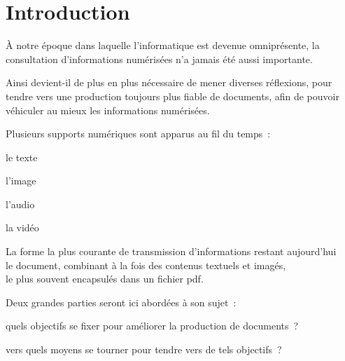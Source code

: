 \section{Introduction}

À notre époque dans laquelle l’informatique est devenue omniprésente,
la consultation d’informations numérisées n’a jamais été aussi importante.

Ainsi devient-il de plus en plus nécessaire de mener diverses réflexions,
pour tendre vers une production toujours plus fiable de documents,
afin de pouvoir véhiculer au mieux les informations numérisées.

Plusieurs supports numériques sont apparus au fil du temps :
\begin{itmz}
\item{le texte}
\item{l’image}
\item{l’audio}
\item{la vidéo}
\end{itmz}
La forme la plus courante de transmission d’informations restant aujourd’hui\\
le document, combinant à la fois des contenus textuels et imagés,\\
le plus souvent encapsulés dans un fichier \gls{pdf}.

Deux grandes parties seront ici abordées à son sujet :
\begin{enum}
\item{quels objectifs se fixer pour améliorer la production de documents ?}
\item{vers quels moyens se tourner pour tendre vers de tels objectifs ?}
\end{enum}

\pagebreak
